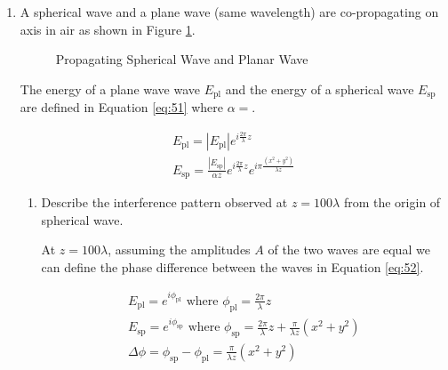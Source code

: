 \documentclass[main.tex]{subfiles}
\begin{document}
\begin{enumerate}
\item{A spherical wave and a plane wave (same wavelength) are co-propagating on axis in air as shown in Figure \ref{fig:51}.}

\begin{figure}
\centering{}
\caption{Propagating Spherical Wave and Planar Wave}
\label{fig:51}
\end{figure}

The energy of a plane wave wave $E_{\mathrm{pl}}$ and the energy of a spherical wave $E_{\mathrm{sp}}$ are defined in Equation \ref{eq:51} where $\alpha = $.

\begin{equation}\label{eq:51}
\begin{array}{l}
{E_{\mathrm{pl}}=\left|E_{\mathrm{pl}}\right| e^{i \frac{2 \pi}{\lambda} z}} \\
{E_{\mathrm{sp}}=\frac{\left|E_{\mathrm{sp}}\right|}{\alpha z} e^{i \frac{2 \pi}{\lambda} z} e^{i \pi \frac{\left(x^{2}+y^{2}\right)}{\lambda z}}}
\end{array}
\end{equation}

\begin{enumerate}
\item Describe the interference pattern observed at $z=100\lambda$ from the origin of spherical wave.

At $z=100\lambda$, assuming the amplitudes $A$ of the two waves are equal we can define the phase difference between the waves in Equation \ref{eq:52}. 

\begin{equation}\label{eq:52}
\begin{array}{l}
{E_{\mathrm{pl}}=e^{i \phi_{\mathrm{pl}}} \text { where } \phi_{\mathrm{pl}}=\frac{2 \pi}{\lambda} z} \\ 
{E_{\mathrm{sp}}=e^{i \phi_{\mathrm{sp}}} \text { where } \phi_{\mathrm{sp}}=\frac{2 \pi}{\lambda} z+\frac{\pi}{\lambda z}\left(x^{2}+y^{2}\right)} \\ 
{\Delta \phi=\phi_{\mathrm{sp}}-\phi_{\mathrm{pl}}=\frac{\pi}{\lambda z}\left(x^{2}+y^{2}\right)}\end{array}
\end{equation}


\end{enumerate}
\end{enumerate}
\end{document}
